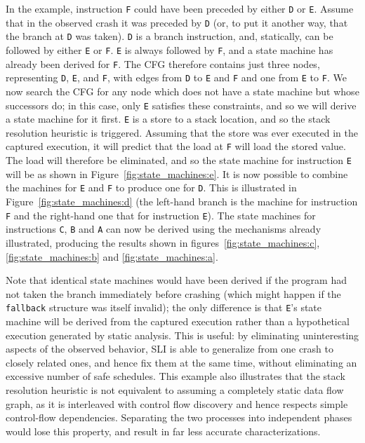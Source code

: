 \documentclass[10pt,letter,twocolumn]{sigplanconf}
\newcommand{\editorial}[1]{}
\begin{document}
In the example, instruction \verb|F| could have been preceded by
either \verb|D| or \verb|E|.  Assume that in the observed crash it was
preceded by \verb|D| (or, to put it another way, that the branch at
\verb|D| was taken).  \verb|D| is a branch instruction, and,
statically, can be followed by either \verb|E| or \verb|F|.  \verb|E|
is always followed by \verb|F|, and a state machine has already been
derived for \verb|F|.  The CFG therefore contains just three nodes,
representing \verb|D|, \verb|E|, and \verb|F|, with edges from
\verb|D| to \verb|E| and \verb|F| and one from \verb|E| to \verb|F|.
We now search the CFG for any node which does not have a state machine
but whose successors do; in this case, only \verb|E| satisfies these
constraints, and so we will derive a state machine for it first.
\verb|E| is a store to a stack location, and so the stack resolution
heuristic is triggered.  Assuming that the store was ever executed in
the captured execution, it will predict that the load at \verb|F| will
load the stored value.  The load will therefore be eliminated, and so
the state machine for instruction \verb|E| will be as shown in
Figure~\ref{fig:state_machines:e}.  It is now possible to combine the
machines for \verb|E| and \verb|F| to produce one for \verb|D|.  This
is illustrated in Figure~\ref{fig:state_machines:d} (the left-hand
branch is the machine for instruction \verb|F| and the right-hand one
that for instruction \verb|E|).  The state machines for instructions
\verb|C|, \verb|B| and \verb|A| can now be derived using the
mechanisms already illustrated, producing the results shown in
figures~\ref{fig:state_machines:c}, \ref{fig:state_machines:b} and
\ref{fig:state_machines:a}.

Note that identical state machines would have been derived if the
program had not taken the branch immediately before crashing (which
might happen if the \verb|fallback| structure was itself invalid); the
only difference is that \verb|E|'s state machine will be derived from
the captured execution rather than a hypothetical execution generated
by static analysis.  This is useful: by eliminating uninteresting
aspects of the observed behavior, SLI is able to generalize from one
crash to closely related ones, and hence fix them at the same time,
without eliminating an excessive number of safe schedules.  This
example also illustrates that the stack resolution heuristic is not
equivalent to assuming a completely static data flow graph, as it is
interleaved with control flow discovery and hence respects simple
control-flow dependencies.  Separating the two processes into
independent phases would lose this property, and result in far less
accurate characterizations.\editorial{ref phase order problem?}
\end{document}
